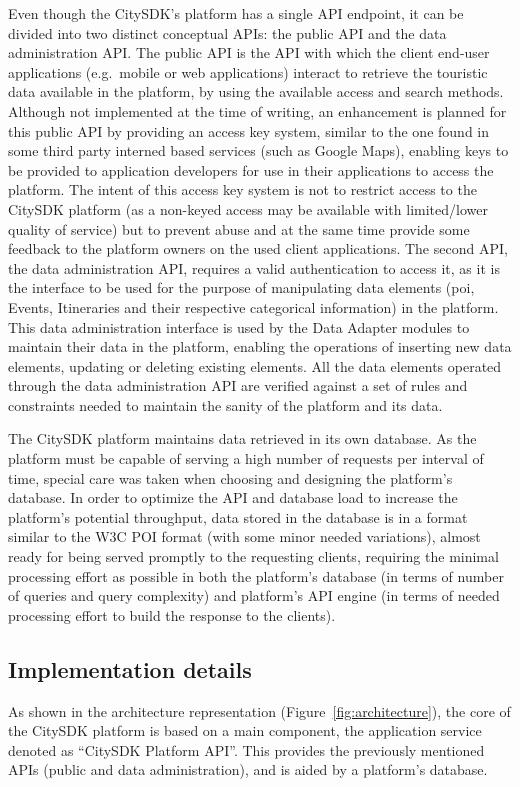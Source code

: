 \documentclass[times,doublespace]{ettauth}%
\begin{document}
Even though the CitySDK's platform has a single API endpoint, it can be divided into two distinct conceptual APIs: the public API and the data administration API\@. 
The public API is the API with which the client end-user applications (e.g.\  mobile or web applications) interact to retrieve the touristic data available in the platform, by using the available access and search methods. 
Although not implemented at the time of writing, an enhancement is planned for this public API by providing an access key system, similar to the one found in some third party interned based services (such as Google Maps), enabling keys to be provided to application developers for use in their applications to access the platform. 
The intent of this access key system is not to restrict access to the CitySDK platform (as a non-keyed access may be available with limited/lower quality of service) but to prevent abuse and at the same time provide some feedback to the platform owners on the used client applications. 
The second API, the data administration API, requires a valid authentication to access it, as it is the interface to be used for the purpose of manipulating data elements (\ac{poi}, Events, Itineraries and their respective categorical information) in the platform. 
This data administration interface is used by the Data Adapter modules to maintain their data in the platform, enabling the operations of inserting new data elements, updating or deleting existing elements. 
All the data elements operated through the data administration API are verified against a set of rules and constraints needed to maintain the sanity of the platform and its data.

The CitySDK platform maintains data retrieved in its own database. 
As the platform must be capable of serving a high number of requests per interval of time, special care was taken when choosing and designing the platform's database. 
In order to optimize the API and database load to increase the platform's potential throughput, data stored in the database is in a format similar to the W3C POI format (with some minor needed variations), almost ready for being served promptly to the requesting clients, requiring the minimal processing effort as possible in both the platform's database (in terms of number of queries and query complexity) and platform's API engine (in terms of needed processing effort to build the response to the clients).

\subsection{Implementation details}
As shown in the architecture representation (Figure~\ref{fig:architecture}), the core of the CitySDK platform is based on a main component, the application service denoted as ``CitySDK Platform API''.
This provides the previously mentioned APIs (public and data administration), and is aided by a platform's database. 
\end{document}
